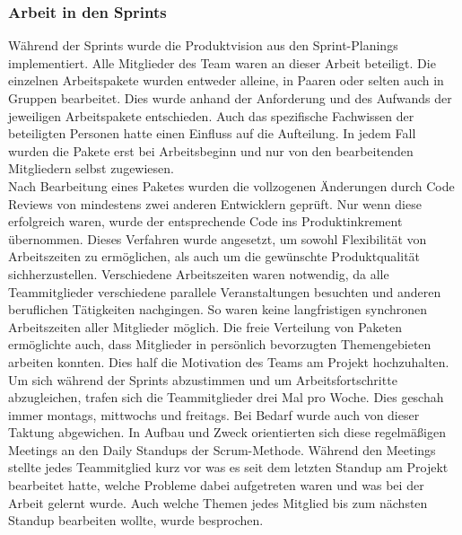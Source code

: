 \documentclass[10pt, a4paper, draft]{article}
\begin{document}
\subsubsection{Arbeit in den Sprints}
Während der Sprints wurde die Produktvision aus den Sprint-Planings implementiert.
Alle Mitglieder des Team waren an dieser Arbeit beteiligt.
Die einzelnen Arbeitspakete wurden entweder alleine, in Paaren oder selten auch in Gruppen bearbeitet.
Dies wurde anhand der Anforderung und des Aufwands der jeweiligen Arbeitspakete entschieden.
Auch das spezifische Fachwissen der beteiligten Personen hatte einen Einfluss auf die Aufteilung.
In jedem Fall wurden die Pakete erst bei Arbeitsbeginn und nur von den bearbeitenden Mitgliedern selbst zugewiesen.
\\
Nach Bearbeitung eines Paketes wurden die vollzogenen Änderungen durch Code Reviews von mindestens zwei anderen Entwicklern geprüft.
Nur wenn diese erfolgreich waren, wurde der entsprechende Code ins Produktinkrement übernommen.
Dieses Verfahren wurde angesetzt, um sowohl Flexibilität von Arbeitszeiten zu ermöglichen, als auch um die gewünschte Produktqualität sichherzustellen.
Verschiedene Arbeitszeiten waren notwendig, da alle Teammitglieder verschiedene parallele Veranstaltungen besuchten und anderen beruflichen Tätigkeiten nachgingen.
So waren keine langfristigen synchronen Arbeitszeiten aller Mitglieder möglich.
Die freie Verteilung von Paketen ermöglichte auch, dass Mitglieder in persönlich bevorzugten Themengebieten arbeiten konnten.
Dies half die Motivation des Teams am Projekt hochzuhalten.
\\
Um sich während der Sprints abzustimmen und um Arbeitsfortschritte abzugleichen, trafen sich die Teammitglieder drei Mal pro Woche.
Dies geschah immer montags, mittwochs und freitags.
Bei Bedarf wurde auch von dieser Taktung abgewichen.
In Aufbau und Zweck orientierten sich diese regelmäßigen Meetings an den \glqq Daily Standups\grqq{} der Scrum-Methode.
Während den Meetings stellte jedes Teammitglied kurz vor was es seit dem letzten Standup am Projekt bearbeitet hatte, welche Probleme dabei aufgetreten waren und was bei der Arbeit gelernt wurde.
Auch welche Themen jedes Mitglied bis zum nächsten Standup bearbeiten wollte, wurde besprochen.
\end{document}
